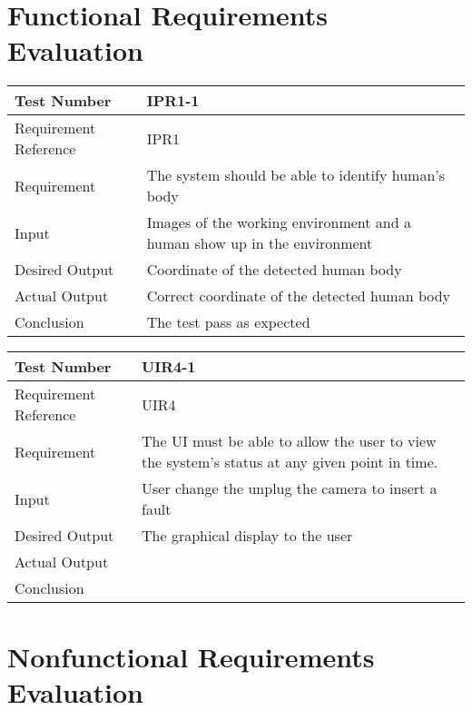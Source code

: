 \documentclass[12pt, titlepage]{article}
\begin{document}
\section{Functional Requirements Evaluation}
\begin{table}[H]
\begin{center}
\begin{tabular}{|p{} | p{}|}
\hline
  Test Number & IPR1-1\\
  \hline
  Requirement Reference & IPR1\\
  \hline
  Requirement &  The system should be able to identify human’s body\\
  \hline
  Input & Images of the working environment and a human show up in
the environment\\
  \hline
  Desired Output & Coordinate of the detected human body\\
  \hline
  Actual Output & Correct coordinate of the detected human body\\
  \hline
  Conclusion & The test pass as expected\\
  \hline
\end{tabular}
\end{center}           
\end{table}

\begin{table}[H]
\begin{center}
\begin{tabular}{|p{} | p{}|}
\hline
  Test Number & UIR4-1\\
  \hline
  Requirement Reference & UIR4\\
  \hline
  Requirement &  The UI must be able to allow the user to view the system’s status at any given point in time.\\
  \hline
  Input & User change the unplug the camera to insert a fault\\
  \hline
  Desired Output & The graphical display to the user\\
  \hline
  Actual Output & \\
  \hline
  Conclusion & \\
  \hline
\end{tabular}
\end{center}           
\end{table}



\section{Nonfunctional Requirements Evaluation}
\end{document}
